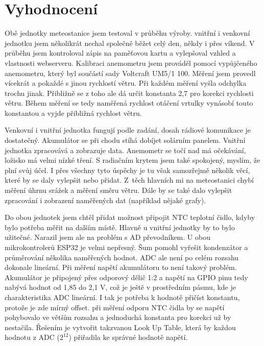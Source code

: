 \chapter{Vyhodnocení} \label{Vyhodnoceni}
    Obě jednotky meteostanice jsem testoval v průběhu výroby. vnitřní i venkovní jednotku jsem několikrát nechal společně běžet celý den, někdy i přes víkend. V průběhu jsem kontroloval zápis na paměťovou kartu a vylepšoval vzhled a vlastnosti webserveru. Kalibraci anemometru jsem prováděl pomocí vypůjčeného anemometru, který byl součástí sady Voltcraft UM5/1 100. Měření jsem provedl vícekrát a pokaždé s jinou rychlostí větru. Při každém měření vyšla odchylka trochu jinak. Přibližně se z toho ale dá určit konstanta 2,7 pro korekci rychlosti větru. Během měření se tedy naměřená rychlost otáčení vrtulky vynásobí touto konstantou a vyjde přibližná rychlost větru.

    Venkovní i vnitřní jednotka fungují podle zadání, dosah rádiové komunikace je dostatečný. Akumulátor se při chodu stíhá dobíjet solárním panelem. Vnitřní jednotka zpracovává a zobrazuje data. Anemometr se točí nad má očekávání, ložisko má velmi nízké tření. S radiačním krytem jsem také spokojený, myslím, že plní svůj účel. I přes všechny tyto úspěchy je tu však samozřejmě několik věcí, které by se daly vylepšit nebo přidat. Z~těch hlavních  mi na meteostanici chybí měření úhrnu srážek a měření směru větru. Dále by se také dalo vylepšit zpracování i zobrazení naměřených dat (například nějaké grafy). 

    Do obou jednotek jsem chtěl přidat možnost připojit NTC teplotní čidlo, kdyby bylo potřeba měřit na dalším místě. Hlavně u vnitřní jednotky by to bylo užitečné. Narazil jsem ale na problém s AD převodníkem. U obou mikrokontrolerů ESP32 je velmi nepřesný. Šum pomohl vyřešit kondenzátor a průměrování několika naměřených hodnot. ADC ale není po celém rozsahu dokonale lineární. Při měření napětí akumulátoru to není takový problém. Akumulátor je připojený přes odporový dělič 1:2 a napětí na GPIO pinu tedy nabývá hodnot od 1,85 do 2,1 V, což je ještě v prostředním pásmu, kde je charakteristika ADC lineární. I tak je potřeba k hodnotě přičíst konstantu, protože je zde mírný offset. při měření odporu NTC čidla by se napětí pohybovalo ve větším rozsahu a jednoduchá konstanta pro korekci už by nestačila. Řešením je vytvořit takzvanou Look Up Table, která by každou hodnotu z ADC ($2^{12}$) přiřadila ke správné hodnotě napětí.